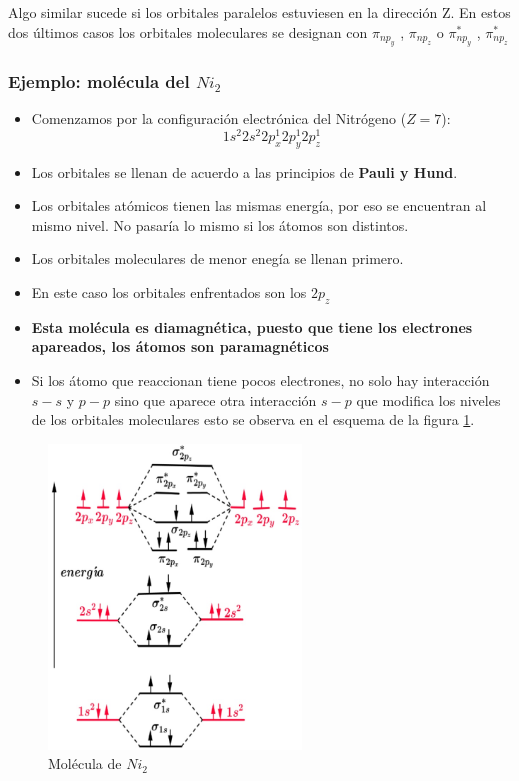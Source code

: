 	
Algo similar sucede si los orbitales paralelos estuviesen en la dirección Z. En estos dos últimos casos los orbitales moleculares se designan con $\pi_{np_{y}}$ , $\pi_{np_{z}}$ o $\pi_{np_{y}}^{*}$ , $\pi_{np_{z}}^{*}$

\subsubsection{Ejemplo: molécula del $Ni_{2}$}

\begin{itemize}
	\item Comenzamos por la configuración electrónica del Nitrógeno ($Z=7$):
	\begin{equation}
		1s^{2}2s^{2}2p^{1}_{x}2p^{1}_{y}2p^{1}_{z}
	\end{equation}
	\item Los orbitales se llenan de acuerdo a las principios de \textbf{Pauli y Hund}. 
	\item Los orbitales atómicos tienen las mismas energía, por eso se encuentran al mismo nivel. No pasaría lo mismo si los átomos son distintos.
	\item Los orbitales moleculares de menor enegía se llenan primero.
	\item En este caso los orbitales enfrentados son los $2p_{z}$
	\item \textbf{Esta molécula es diamagnética, puesto que tiene los electrones apareados, los átomos son paramagnéticos}
	\item Si los átomo que reaccionan tiene pocos electrones, no solo hay interacción $s-s$ y $p-p$ sino que aparece otra interacción $s-p$ que modifica los niveles de los orbitales moleculares esto se observa en el esquema de la figura \ref{fig:EjemploNi2}.
\end{itemize}

\begin{figure}[H]
    \centering
    \includegraphics[width=0.6\textwidth]{./Figures/EjemploNi2}
	\caption{Molécula de $Ni_{2}$}
	\label{fig:EjemploNi2}
\end{figure}

